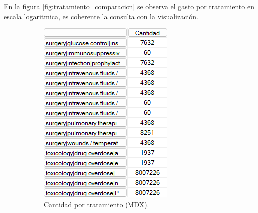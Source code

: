 \documentclass{article}
\begin{document}
En la figura \ref{fig:tratamiento_comparacion} se observa el gasto por tratamiento en escala logaritmica, es coherente la consulta con la visualización.
\begin{figure}[H]
	\centering
	\begin{subfigure}[b]{0.4\textwidth}
		\centering
		\includegraphics[width=\textwidth]{images/cantidad_tratamiento_mdx.png}
		\caption{Cantidad por tratamiento (MDX).}
		\label{fig:tratamiento_mdx}
	\end{subfigure}
	\hfill
	\begin{subfigure}[b]{0.4\textwidth}
		\centering

\end{subfigure}
\end{figure}
\end{document}

